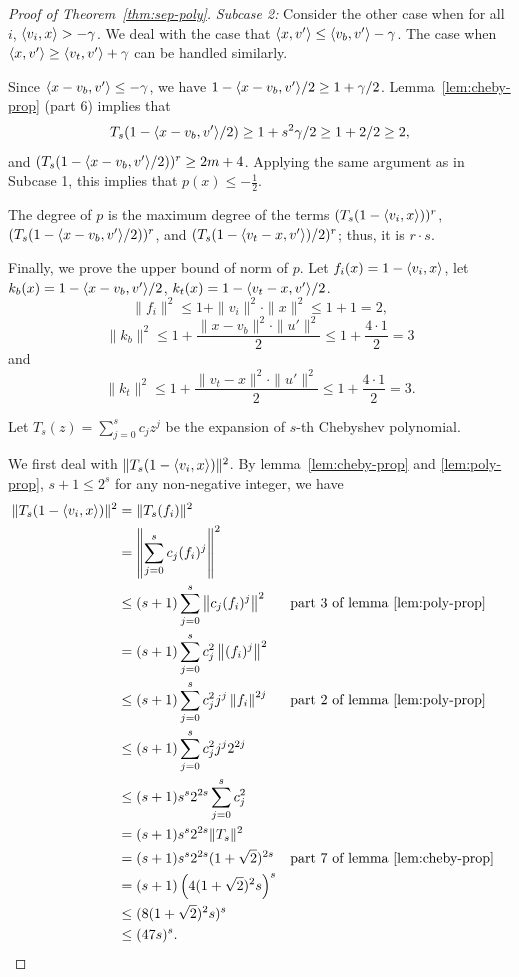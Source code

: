\begin{proof}[Proof of Theorem~\ref{thm:sep-poly}]
{\em Subcase 2:} Consider the other case when for all $i$, $\langle v_i,x\rangle > -\gamma$.
We deal with the case that $\langle x,v'\rangle \leq \langle v_b,v'\rangle-\gamma$.  
The case when $\langle x,v'\rangle \geq \langle v_t,v'\rangle+\gamma$ can be handled similarly.

Since $\langle x-v_b,v'\rangle \leq -\gamma$, we have $1-\langle x-v_b,v'\rangle/2\geq 1 + \gamma/2$.
Lemma~\ref{lem:cheby-prop} (part 6) implies that
\[
  T_s(1-\langle x-v_b,v'\rangle/2)\geq 1+s^2\gamma/2 \geq 1+2/2 \geq 2,
\]
and $(T_s(1-\langle x-v_b,v'\rangle/2))^r\geq 2m+4$.  
Applying the same argument as in Subcase 1, this implies that $p(x)\leq-\frac{1}{2}$.

The degree of $p$ is the maximum degree of the terms $(T_s(1-\langle v_i,x\rangle))^r$, $(T_s(1-\langle x-v_b,v'\rangle/2))^r$, and $(T_s(1-\langle v_t-x,v'\rangle)/2)^r$; thus, it is $r\cdot s$.

Finally, we prove the upper bound of norm of $p$. Let $f_i(x)=1-\langle v_i,x\rangle$, 
let $k_b(x)=1-\langle x-v_b,v'\rangle/2$, $k_t(x)=1-\langle v_t-x,v'\rangle/2$.
\[
\|f_i\|^2\leq 1+\|v_i\|^2\cdot\|x\|^2\leq 1+1=2,
\]
\[
\|k_b\|^2\leq 1+\frac{\|x-v_b\|^2\cdot\|u'\|^2}{2}\leq 1+\frac{4\cdot1}{2}=3
\]
and
\[
\|k_t\|^2\leq 1+\frac{\|v_t-x\|^2\cdot\|u'\|^2}{2}\leq 1+\frac{4\cdot1}{2}=3.
\]

Let $T_s(z)=\sum_{j=0}^s c_j z^j$ be the expansion of $s$-th Chebyshev polynomial.

We first deal with $\|T_s(1-\langle v_i,x\rangle)\|^2$.
By lemma~\ref{lem:cheby-prop} and \ref{lem:poly-prop}, $s+1\leq2^s$ for any non-negative integer, we have
\begin{align*}
    \|T_s(1-\langle v_i,x\rangle)\|^2 &= \|T_s(f_i)\|^2 \\
    &=\left\|\sum_{j=0}^s c_j(f_i)^j\right\|^2\\
    &\leq (s+1)\sum_{j=0}^s\left\| c_j(f_i)^j\right\|^2 & &\text{part 3 of lemma~\ref{lem:poly-prop}}\\
    &=(s+1)\sum_{j=0}^s c_j^2\left\|(f_i)^j\right\|^2 \\
    &\leq (s+1)\sum_{j=0}^s c_j^2j^j\left\|f_i\right\|^{2j} & &\text{part 2 of lemma~\ref{lem:poly-prop}}\\
    &\leq (s+1)\sum_{j=0}^s c_j^2j^j2^{2j}\\
    &\leq (s+1)s^s2^{2s}\sum_{j=0}^s c_j^2 \\
    &=(s+1)s^s2^{2s}\|T_s\|^2 \\
    &=(s+1)s^s2^{2s}(1+\sqrt{2})^{2s} & &\text{part 7 of lemma~\ref{lem:cheby-prop}}\\
    &=(s+1)\left(4(1+\sqrt{2})^2s\right)^s \\
    &\leq (8(1+\sqrt{2})^2s)^s \\
    &\leq (47s)^s.
\end{align*}


\end{proof}
